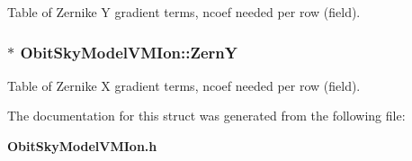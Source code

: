 Table of Zernike Y gradient terms, ncoef needed per row (field). 

\subsubsection{$\ast$ {\bf Obit\-Sky\-Model\-VMIon::Zern\-Y}}\label{structObitSkyModelVMIon_o64}


Table of Zernike X gradient terms, ncoef needed per row (field). 



The documentation for this struct was generated from the following file:\begin{CompactItemize}
\item 
{\bf Obit\-Sky\-Model\-VMIon.h}\end{CompactItemize}

